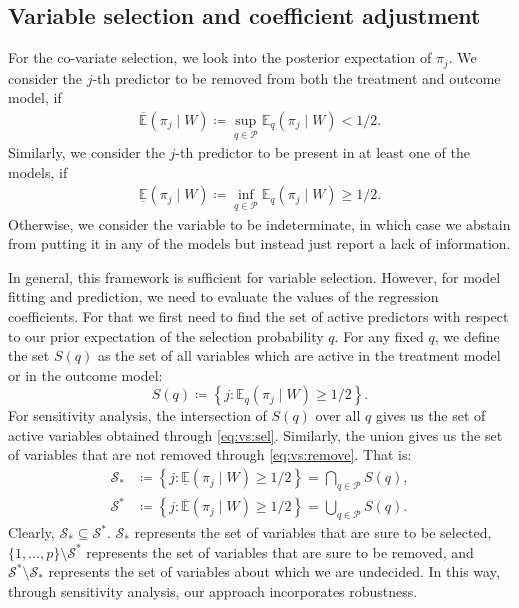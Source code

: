 \documentclass[preprint,12pt]{elsarticle}
\newcommand{\lexp}{\underline{\mathbb{E}}}
\newcommand{\uexp}{\overline{\mathbb{E}}}
\begin{document}
\subsection{Variable selection and coefficient adjustment}
For the co-variate selection, we look into the posterior expectation of $\pi_j$. 
We consider the $j$-th predictor to be removed from both the
treatment and outcome model, if
\begin{align}\label{eq:vs:remove}
	\uexp (\pi_j\mid W)\coloneqq \sup_{q\in \mathcal{P}} \mathbb{E}_q(\pi_j\mid W) < 1/2.
\end{align}
Similarly, we consider the $j$-th predictor to be present in at least one of the models, if
\begin{align}\label{eq:vs:sel}
	\lexp (\pi_j\mid W)\coloneqq \inf_{q\in \mathcal{P}} \mathbb{E}_q(\pi_j\mid W) \ge 1/2.
\end{align}
Otherwise, we consider the variable to be indeterminate,  in which case we abstain from putting
it in any of the models but instead just report a lack of information.

In general, this framework is
sufficient
for variable selection. However, for
model fitting and prediction, we need to evaluate the values 
of the regression coefficients. For that we first need to find the set of active
predictors with respect to our prior expectation of the selection probability $q$.
For any fixed $q$, we define the set $S(q)$ as the set of all variables which are active
in the treatment model or in the outcome model:
\begin{equation}
	S(q)\coloneqq
	\left\{j\colon \mathbb{E}_q(\pi_j\mid W) \ge 1/2\right\}.
\end{equation}
For sensitivity analysis,
the intersection of $S(q)$ over all $q$ gives us the set of
active variables obtained through \cref{eq:vs:sel}.
Similarly, the union gives us the set of
variables that are not removed through \cref{eq:vs:remove}.
That is:
\begin{align}
    \mathcal{S}_*&\coloneqq \left\{j:\lexp (\pi_j\mid W)\ge1/2\right\}
    = \bigcap_{q\in \mathcal{P}}S(q), \\
    \mathcal{S}^*&\coloneqq \left\{j:\uexp (\pi_j\mid W)\ge1/2\right\}
    = \bigcup_{q\in \mathcal{P}}S(q).
\end{align}
Clearly, $\mathcal{S}_*\subseteq\mathcal{S}^*$.
$\mathcal{S}_*$ represents the set of variables that are sure to be selected,
$\{1,\dots,p\}\setminus\mathcal{S}^*$ represents the set of variables that are sure to be removed, and
$\mathcal{S}^*\setminus\mathcal{S}_*$ represents the set of variables about which we are undecided.
In this way, through sensitivity analysis, our approach incorporates robustness.
\end{document}
